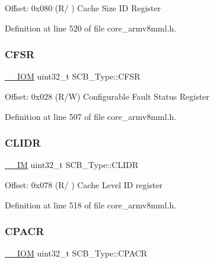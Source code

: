 Offset\+: 0x080 (R/ ) Cache Size ID Register 

Definition at line 520 of file core\+\_\+armv8mml.\+h.

\mbox{\label{struct_s_c_b___type_a0cda9e061b42373383418663092ad19a}} 
\subsubsection{\texorpdfstring{C\+F\+SR}{CFSR}}
{\footnotesize\ttfamily \hyperlink{core__sc300_8h_ab6caba5853a60a17e8e04499b52bf691}{\+\_\+\+\_\+\+I\+OM} uint32\+\_\+t S\+C\+B\+\_\+\+Type\+::\+C\+F\+SR}

Offset\+: 0x028 (R/W) Configurable Fault Status Register 

Definition at line 507 of file core\+\_\+armv8mml.\+h.

\mbox{\label{struct_s_c_b___type_ad9899f5775251cf5ef0cb0845527afc2}} 
\subsubsection{\texorpdfstring{C\+L\+I\+DR}{CLIDR}}
{\footnotesize\ttfamily \hyperlink{core__sc300_8h_a4cc1649793116d7c2d8afce7a4ffce43}{\+\_\+\+\_\+\+IM} uint32\+\_\+t S\+C\+B\+\_\+\+Type\+::\+C\+L\+I\+DR}

Offset\+: 0x078 (R/ ) Cache Level ID register 

Definition at line 518 of file core\+\_\+armv8mml.\+h.

\mbox{\label{struct_s_c_b___type_ac6a860c1b8d8154a1f00d99d23b67764}} 
\subsubsection{\texorpdfstring{C\+P\+A\+CR}{CPACR}}
{\footnotesize\ttfamily \hyperlink{core__sc300_8h_ab6caba5853a60a17e8e04499b52bf691}{\+\_\+\+\_\+\+I\+OM} uint32\+\_\+t S\+C\+B\+\_\+\+Type\+::\+C\+P\+A\+CR}

